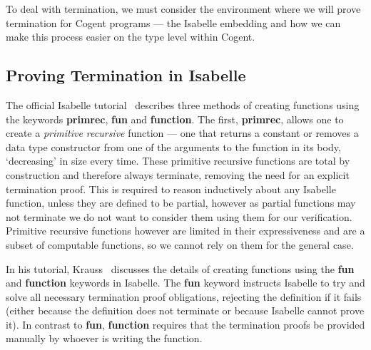 To deal with termination, we must consider the environment where we will prove termination for
Cogent programs --- the Isabelle embedding and how we can make this process easier on the type
level within Cogent.

\subsection{Proving Termination in Isabelle}

The official Isabelle tutorial~\citep{IsabelleTutorial} describes three methods of creating functions using
the keywords \textbf{primrec}, \textbf{fun} and \textbf{function}. The first, \textbf{primrec},
allows one to create a \textit{primitive recursive} function --- one that returns a constant or removes
a data type constructor from one of the arguments to the function in its body, `decreasing' in size every time.
These primitive recursive functions are total by construction and therefore always terminate, removing the need for
an explicit termination proof. This is required to reason inductively about any Isabelle function,
unless they are defined to be partial, however as partial functions may not terminate we do not want
to consider them using them for our verification. Primitive recursive functions however are limited
in their expressiveness and are a subset of computable functions, so we cannot rely on them for the general case.

In his tutorial, Krauss~\citep{KraussIsabelle} discusses the details of creating functions using the \textbf{fun}
and \textbf{function} keywords in Isabelle. The \textbf{fun} keyword instructs Isabelle to try and solve all necessary
termination proof obligations, rejecting the definition if it fails (either because the definition does not 
terminate or because Isabelle cannot prove it). In contrast to \textbf{fun}, \textbf{function}
requires that the termination proofs be provided manually by whoever is writing the function.


